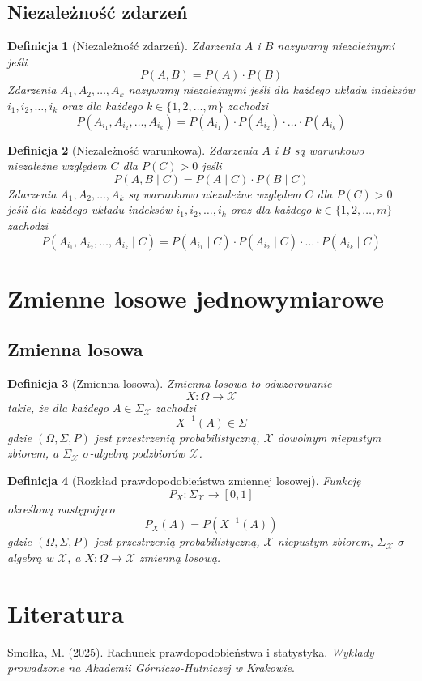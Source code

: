 \documentclass[11pt, leqno]{scrartcl}
\theoremstyle{mydefinition}
\newtheorem{definition}{Definicja}[subsection]
\theoremstyle{mytheorem}
\begin{document}
    \subsection{Niezależność zdarzeń}
    \begin{definition}[Niezależność zdarzeń]
        Zdarzenia $A$ i $B$ nazywamy niezależnymi jeśli
        \[
            P(A,B)=P(A) \cdot P(B)
        \]
        Zdarzenia $A_1,A_2,\ldots,A_k$ nazywamy niezależnymi jeśli dla
        każdego układu indeksów $i_1,i_2,\ldots,i_k$ oraz dla każdego
        $k \in \{1,2,\ldots,m\}$ zachodzi
        \[
            P(A_{i_1},A_{i_2},\ldots,A_{i_k})=P(A_{i_1}) \cdot
            P(A_{i_2}) \cdot \ldots \cdot P(A_{i_k})
        \]
    \end{definition}
    \begin{definition}[Niezależność warunkowa]
        Zdarzenia $A$ i $B$ są warunkowo niezależne względem $C$
        dla $P(C)>0$ jeśli
        \[
            P(A,B \mid C)=P(A \mid C) \cdot P(B \mid C)
        \]
        Zdarzenia $A_1,A_2,\ldots,A_k$ są warunkowo niezależne względem $C$ dla
        $P(C)>0$ jeśli dla każdego układu indeksów $i_1,i_2,\ldots,i_k$ oraz dla
        każdego $k \in \{1,2,\ldots,m\}$ zachodzi
        \[
            P(A_{i_1},A_{i_2},\ldots,A_{i_k} \mid C)=P(A_{i_1} \mid C) \cdot
            P(A_{i_2} \mid C) \cdot \ldots \cdot P(A_{i_k} \mid C)
        \]
    \end{definition}

    \section{Zmienne losowe jednowymiarowe}
    \subsection{Zmienna losowa}
    \begin{definition}[Zmienna losowa]
        Zmienna losowa to odwzorowanie
        \[
            X:\Omega \to \mathcal{X}
        \]
        takie, że dla każdego $A \in \Sigma_{\mathcal{X}}$ zachodzi
        \[
            X^{-1}(A) \in \Sigma
        \]
        gdzie $(\Omega,\Sigma,P)$ jest przestrzenią probabilistyczną,
        $\mathcal{X}$ dowolnym niepustym zbiorem, a $\Sigma_{\mathcal{X}}$
        $\sigma$-algebrą podzbiorów $\mathcal{X}$.
    \end{definition}
    \begin{definition}[Rozkład prawdopodobieństwa zmiennej losowej]
        Funkcję
        \[
            P_X:\Sigma_{\mathcal{X}} \to [0,1]
        \]
        określoną następująco
        \[
            P_X(A)=P(X^{-1}(A))
        \]
        gdzie $(\Omega,\Sigma,P)$ jest przestrzenią probabilistyczną,
        $\mathcal{X}$ niepustym zbiorem, $\Sigma_{\mathcal{X}}$
        $\sigma$-algebrą w $\mathcal{X}$, a $X:\Omega \to \mathcal{X}$
        zmienną losową.
    \end{definition}

    \section{Literatura}
    \begin{thebibliography}{9}
         Smołka, M. (2025). Rachunek prawdopodobieństwa
        i statystyka. \textit{Wykłady prowadzone na Akademii Górniczo-Hutniczej
        w Krakowie}.
    \end{thebibliography}
\end{document}
